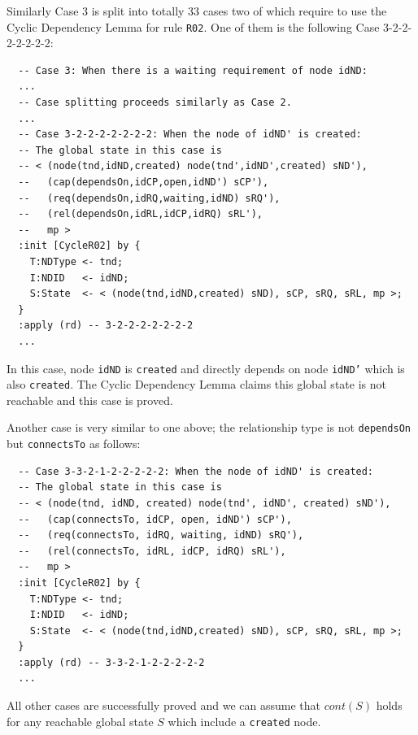 \documentclass[12pt]{report}
\begin{document}
Similarly Case 3 is split into totally 33 cases two of which require
to use the Cyclic Dependency Lemma for rule {\tt R02}. One of them
is the following Case 3-2-2-2-2-2-2-2:
\small
\begin{verbatim}
  -- Case 3: When there is a waiting requirement of node idND:
  ...
  -- Case splitting proceeds similarly as Case 2.
  ...
  -- Case 3-2-2-2-2-2-2-2: When the node of idND' is created:
  -- The global state in this case is
  -- < (node(tnd,idND,created) node(tnd',idND',created) sND'),
  --   (cap(dependsOn,idCP,open,idND') sCP'),
  --   (req(dependsOn,idRQ,waiting,idND) sRQ'),
  --   (rel(dependsOn,idRL,idCP,idRQ) sRL'),
  --   mp >
  :init [CycleR02] by {
    T:NDType <- tnd;
    I:NDID   <- idND;
    S:State  <- < (node(tnd,idND,created) sND), sCP, sRQ, sRL, mp >;
  }
  :apply (rd) -- 3-2-2-2-2-2-2-2
  ...
\end{verbatim}
\normalsize
In this case, node {\tt idND} is {\tt created} and directly depends on
node {\tt idND'} which is also {\tt created}. The Cyclic Dependency
Lemma claims this global state is not reachable and this case is proved.

Another case is very similar to one above; the relationship type
is not {\tt dependsOn} but {\tt connectsTo} as follows:
\small
\begin{verbatim}
  -- Case 3-3-2-1-2-2-2-2-2: When the node of idND' is created:
  -- The global state in this case is
  -- < (node(tnd, idND, created) node(tnd', idND', created) sND'),
  --   (cap(connectsTo, idCP, open, idND') sCP'),
  --   (req(connectsTo, idRQ, waiting, idND) sRQ'),
  --   (rel(connectsTo, idRL, idCP, idRQ) sRL'),
  --   mp >
  :init [CycleR02] by {
    T:NDType <- tnd;
    I:NDID   <- idND;
    S:State  <- < (node(tnd,idND,created) sND), sCP, sRQ, sRL, mp >;
  }
  :apply (rd) -- 3-3-2-1-2-2-2-2-2
  ...
\end{verbatim}
\normalsize

All other cases are successfully proved and we can assume that
$cont(S)$ holds for any reachable global state $S$ which include a
{\tt created} node.

\end{document}
